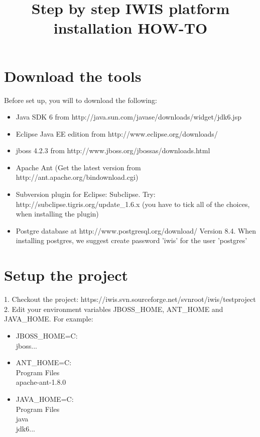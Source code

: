 
\title{Step by step IWIS platform installation HOW-TO}


\maketitle

\section{Download the tools}

Before set up, you will to download the following:

\begin{itemize}
	\item Java SDK 6 from http://java.sun.com/javase/downloads/widget/jdk6.jsp
	\item Eclipse Java EE edition from http://www.eclipse.org/downloads/
	\item jboss 4.2.3 from http://www.jboss.org/jbossas/downloads.html
	\item Apache Ant (Get the latest version from http://ant.apache.org/bindownload.cgi)
	\item Subversion plugin for Eclipse: Subclipse. Try: http://subclipse.tigris.org/update_1.6.x (you have to tick all of the choices, when installing the plugin)
	\item Postgre database at http://www.postgresql.org/download/ Version 8.4. When installing postgres, we suggest create password 'iwis' for the user 'postgres'
\end{itemize}

\section{Setup the project}

1. Checkout the project: https://iwis.svn.sourceforge.net/svnroot/iwis/testproject
2. Edit your environment variables JBOSS_HOME, ANT_HOME and JAVA_HOME. For example:
\begin{itemize}
	\item JBOSS_HOME=C:\\jboss...
	\item ANT_HOME=C:\\Program Files\\apache-ant-1.8.0
	\item JAVA_HOME=C:\\Program Files\\java\\jdk6...
\end{itemize}

